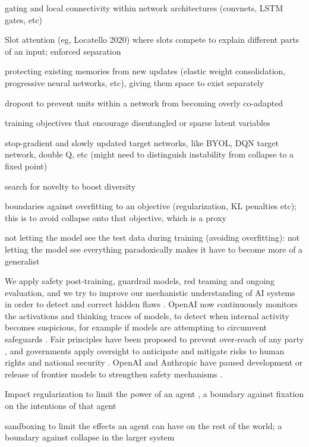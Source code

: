 \documentclass[11pt]{article}
\begin{document}
gating and local connectivity within network architectures (convnets, LSTM gates, etc)

Slot attention (eg, Locatello 2020) where slots compete to explain different parts of an input; enforced separation

protecting existing memories from new updates (elastic weight consolidation, progressive neural networks, etc), giving them space to exist separately

dropout to prevent units within a network from becoming overly co-adapted \citep{srivastava2014dropout}

training objectives that encourage disentangled or sparse latent variables \citep{higgins2017betavae, cunningham2024sparse}

stop-gradient and slowly updated target networks, like BYOL, DQN target network, double Q, etc (might need to distinguish instability from collapse to a fixed point)

search for novelty to boost diversity \citep{lehman2011abandoning}

boundaries against overfitting to an objective (regularization, KL penalties etc); this is to avoid collapse onto that objective, which is a proxy

not letting the model see the test data during training (avoiding overfitting): not letting the model see everything paradoxically makes it have to become more of a generalist


We apply safety post-training, guardrail models, red teaming and ongoing evaluation, and we try to improve our mechanistic understanding of AI systems in order to detect and correct hidden flaws \citep{olah2020zoom}. OpenAI now continuously monitors the activations and thinking traces of models, to detect when internal activity becomes suspicious, for example if models are attempting to circumvent safeguards \citep{openai2026pacing}. Fair principles have been proposed to prevent over-reach of any party \citep{gabriel2025matter}, and governments apply oversight to anticipate and mitigate risks to human rights and national security \citep{eu2024aiact}. OpenAI and Anthropic have paused development or release of frontier models to strengthen safety mechanisms \citep{openai2026pacing, anthropic2026mythos}.

Impact regularization to limit the power of an agent \citep{krakovna2018penalizing}, a boundary against fixation on the intentions of that agent

sandboxing to limit the effects an agent can have on the rest of the world; a boundary against collapse in the larger system
\end{document}
